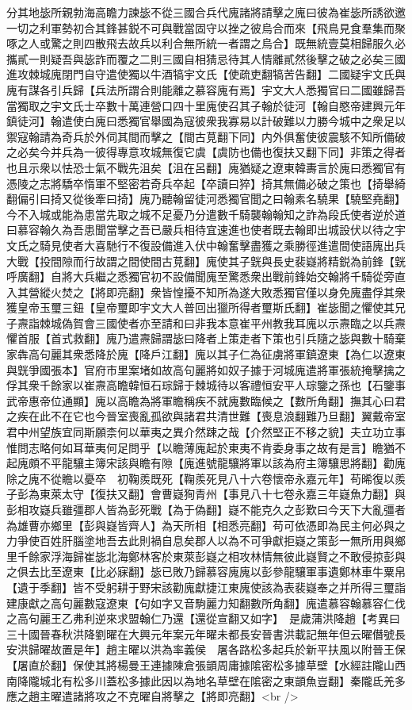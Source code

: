 分其地毖所親勃海高瞻力諫毖不從三國合兵代廆諸將請擊之廆曰彼為崔毖所誘欲邀一切之利軍勢初合其鋒甚鋭不可與戰當固守以挫之彼烏合而來【飛鳥見食羣集而聚啄之人或驚之則四散飛去故兵以利合無所統一者謂之烏合】既無統壹莫相歸服久必攜貳一則疑吾與毖詐而覆之二則三國自相猜忌待其人情離貳然後擊之破之必矣三國進攻棘城廆閉門自守遣使獨以牛酒犒宇文氏【使疏吏翻犒苦告翻】二國疑宇文氏與廆有謀各引兵歸【兵法所謂合則能離之慕容廆有焉】宇文大人悉獨官曰二國雖歸吾當獨取之宇文氏士卒數十萬連營口四十里廆使召其子翰於徒河【翰自愍帝建興元年鎮徒河】翰遣使白廆曰悉獨官舉國為寇彼衆我寡易以計破難以力勝今城中之衆足以禦寇翰請為奇兵於外伺其間而擊之【間古莧翻下同】内外俱奮使彼震駭不知所備破之必矣今并兵為一彼得專意攻城無復它虞【虞防也備也復扶又翻下同】非策之得者也且示衆以怯恐士氣不戰先沮矣【沮在呂翻】廆猶疑之遼東韓夀言於廆曰悉獨官有憑陵之志將驕卒惰軍不堅密若奇兵卒起【卒讀曰猝】掎其無備必破之策也【掎舉綺翻偏引曰掎又從後牽曰掎】廆乃聽翰留徒河悉獨官聞之曰翰素名驍果【驍堅堯翻】今不入城或能為患當先取之城不足憂乃分遣數千騎襲翰翰知之詐為段氏使者逆於道曰慕容翰久為吾患聞當擊之吾已嚴兵相待宜速進也使者既去翰即出城設伏以待之宇文氏之騎見使者大喜馳行不復設備進入伏中翰奮擊盡獲之乘勝徑進遣間使語廆出兵大戰【投間隙而行故謂之間使間古莧翻】廆使其子皝與長史裴嶷將精鋭為前鋒【皝呼廣翻】自將大兵繼之悉獨官初不設備聞廆至驚悉衆出戰前鋒始交翰將千騎從旁直入其營縱火焚之【將即亮翻】衆皆惶擾不知所為遂大敗悉獨官僅以身免廆盡俘其衆獲皇帝玉璽三鈕【皇帝璽即宇文大人普回出獵所得者璽斯氏翻】崔毖聞之懼使其兄子燾詣棘城偽賀會三國使者亦至請和曰非我本意崔平州教我耳廆以示燾臨之以兵燾懼首服【首式救翻】廆乃遣燾歸謂毖曰降者上策走者下策也引兵隨之毖與數十騎棄家犇高句麗其衆悉降於廆【降戶江翻】廆以其子仁為征虜將軍鎮遼東【為仁以遼東與皝爭國張本】官府市里案堵如故高句麗將如奴子據于河城廆遣將軍張統掩擊擒之俘其衆千餘家以崔燾高瞻韓恒石琮歸于棘城待以客禮恒安平人琮鑒之孫也【石鑒事武帝惠帝位通顯】廆以高瞻為將軍瞻稱疾不就廆數臨候之【數所角翻】撫其心曰君之疾在此不在它也今晉室喪亂孤欲與諸君共清世難【喪息浪翻難乃旦翻】翼戴帝室君中州望族宜同斯願柰何以華夷之異介然踈之哉【介然堅正不移之貌】夫立功立事惟問志略何如耳華夷何足問乎【以瞻薄廆起於東夷不肯委身事之故有是言】瞻猶不起廆頗不平龍驤主簿宋該與瞻有隙【廆進號龍驤將軍以該為府主簿驤思將翻】勸廆除之廆不從瞻以憂卒　初鞠羨既死【鞠羨死見八十六卷懷帝永嘉元年】苟晞復以羨子彭為東萊太守【復扶又翻】會曹嶷狥青州【事見八十七卷永嘉三年嶷魚力翻】與彭相攻嶷兵雖彊郡人皆為彭死戰【為于偽翻】嶷不能克久之彭歎曰今天下大亂彊者為雄曹亦鄉里【彭與嶷皆齊人】為天所相【相悉亮翻】苟可依憑即為民主何必與之力爭使百姓肝腦塗地吾去此則禍自息矣郡人以為不可爭獻拒嶷之策彭一無所用與鄉里千餘家浮海歸崔毖北海鄭林客於東萊彭嶷之相攻林情無彼此嶷賢之不敢侵掠彭與之俱去比至遼東【比必寐翻】毖已敗乃歸慕容廆廆以彭參龍驤軍事遺鄭林車牛粟帛【遺于季翻】皆不受躬耕于野宋該勸廆獻捷江東廆使該為表裴嶷奉之并所得三璽詣建康獻之高句麗數寇遼東【句如字又音駒麗力知翻數所角翻】廆遣慕容翰慕容仁伐之高句麗王乙弗利逆來求盟翰仁乃還【還從宣翻又如字】　是歲蒲洪降趙【考異曰三十國晉春秋洪降劉曜在大興元年案元年曜未都長安晉書洪載記無年但云曜僭號長安洪歸曜故置是年】趙主曜以洪為率義侯　屠各路松多起兵於新平扶風以附晉王保【屠直於翻】保使其將楊曼王連據陳倉張顗周庸據隂密松多據草壁【水經註隴山西南降隴城北有松多川蓋松多據此因以為地名草壁在隂密之東顗魚豈翻】秦隴氐羌多應之趙主曜遣諸將攻之不克曜自將擊之【將即亮翻】<br />
